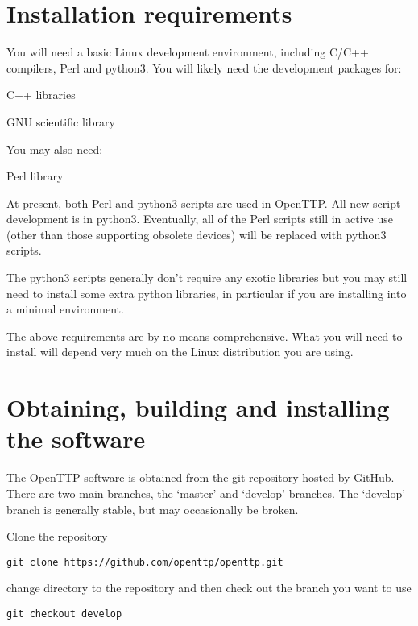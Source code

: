 
\section{Installation requirements}

You will need a basic Linux development environment, including C/C++ compilers, Perl and python3.
You will likely need the development packages for:
\begin{description*}
	\item[\cc{boost}]  C++ libraries
	\item[\cc{libgsl}] GNU scientific library
\end{description*}

You may also need:
\begin{description*}
	\item[\cc{Time::HiRes}] Perl library
\end{description*}

At present, both Perl and python3 scripts are used in OpenTTP. 
All new script development is in python3.
Eventually, all of the Perl scripts still in active use (other than those supporting obsolete devices) will be replaced 
with python3 scripts.

The python3 scripts generally don't require any exotic libraries but you may still need to 
install some extra python libraries, in particular if you are installing into a minimal environment.


The above requirements are by no means comprehensive.
What you will need to install will depend very much on the
Linux distribution you are using.

\section{Obtaining, building and installing the software}

The OpenTTP software is obtained from the git repository hosted by GitHub.
There are two main branches, the `master' and `develop' branches.
The `develop' branch is generally stable, but may occasionally be broken.

Clone the repository
\begin{lstlisting}
git clone https://github.com/openttp/openttp.git
\end{lstlisting}
change directory to the repository and then check out the branch you want to use
\begin{lstlisting}
git checkout develop
\end{lstlisting}

